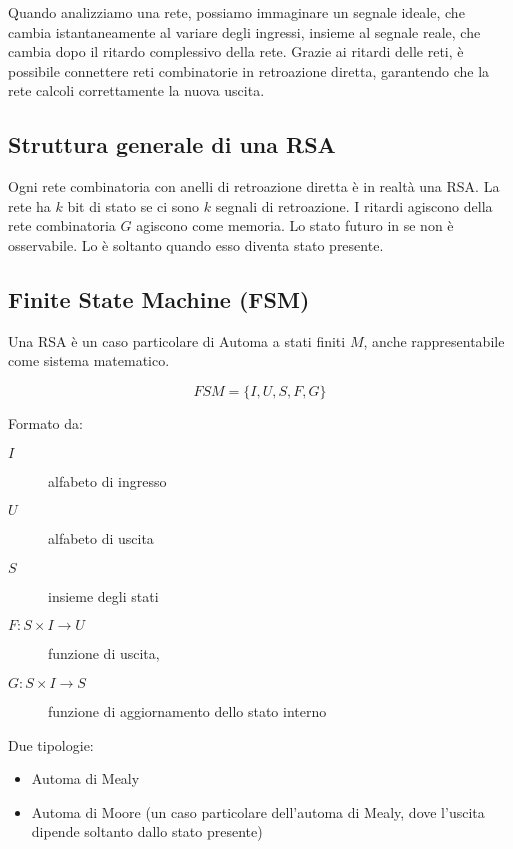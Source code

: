 \documentclass{article}
\begin{document}
\noindent
Quando analizziamo una rete, possiamo immaginare un segnale ideale, che cambia istantaneamente al variare degli ingressi, insieme al segnale reale, che cambia dopo il ritardo complessivo della rete.
Grazie ai ritardi delle reti, è possibile connettere reti combinatorie in retroazione diretta, garantendo che la rete calcoli correttamente la nuova uscita.

\subsection{Struttura generale di una RSA}

Ogni rete combinatoria con anelli di retroazione diretta è in realtà una RSA.
La rete ha $k$ bit di stato se ci sono $k$ segnali di retroazione.
I ritardi agiscono della rete combinatoria $G$ agiscono come memoria.
Lo stato futuro in se non è osservabile.
Lo è soltanto quando esso diventa stato presente.

\subsection{Finite State Machine (FSM)}

Una RSA è un caso particolare di Automa a stati finiti $M$, anche rappresentabile come sistema matematico.

$$
FSM = \{I,U,S,F,G\}
$$

\noindent
Formato da:

\begin{description}
    \item[$I$] alfabeto di ingresso
    \item[$U$] alfabeto di uscita
    \item[$S$] insieme degli stati
\end{description}

\begin{description}
    \item[$F: S \times I \to U$] funzione di uscita,
    \item[$G: S \times I \to S$] funzione di aggiornamento dello stato interno
\end{description}

\noindent
Due tipologie:

\begin{itemize}
    \item Automa di Mealy
    \item Automa di Moore (un caso particolare dell'automa di Mealy, dove l'uscita dipende soltanto dallo stato presente)
\end{itemize}
\end{document}
